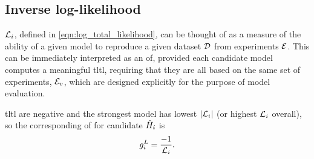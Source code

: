 \begin{table}    
    \begin{center}
    \end{center}
    \caption[Objective function examples]{
        Examples of how each \acrfull{of}, $g$ as described in \cref{sec:inverse_ll} to \cref{sec:elo},
            assign selection probability (denoted \%) to the same set of candidate models, $\{\hi\}$ listed in \cref{eqn:obj_fnc_eg_models}, 
            when attempting to learn data from $\ho$. 
        Intermediate quantities, e.g. $w_i^A$, $g_i^p$ are described in the section of the main text describing the corresponding \gls{of}.
        For each model we first summarise its
            \gls{fscore} (\cref{eqn:f1_score}),
            number of terms $k$,
            median  \gls{likelihood} $\overline{l_e}$ (\cref{eqn:log_likelihood}),     
            and \acrshort{tltl} $\tll_{i}$ (\cref{eqn:log_total_likelihood}), 
        We use $n=250$ samples, i.e. $\tll_{i}$ is a sum of $n$ \glspl{likelihood} .  
        The set of models is truncated so that only the strongest four are assigned selection probability. 
    }
    \label{table:objective_functions}
\end{table}

\subsection{Inverse log-likelihood}\label{sec:inverse_ll}
$\tll_{i}$, defined in \cref{eqn:log_total_likelihood}, can be thought of as a measure of the 
    ability of a given model to reproduce a given dataset ${ \mathcal{D} }$ from \glspl{experiment} ${ \mathcal{E} }$.     
This can be immediately interpreted as an \gls{of}, provided each candidate model 
    computes a meaningful \gls{tltl}, requiring that they are all based on the same set of \glspl{experiment}, ${ \mathcal{E} }_v$,
    which are designed explicitly for the purpose of model evaluation. 
\par 

\gls{tltl} are negative and the strongest model has lowest $\lvert {\mathcal{L}}_{i} \rvert$ (or highest $\tll_{i}$ overall),
    so the corresponding \gls{of} for candidate $\hat{H}_i$ is 
\begin{equation}
    \label{eqn:obj_log_likelihood}
    g_i^{L} = \frac{-1}{{\mathcal{L}}_{i}}.
\end{equation}

